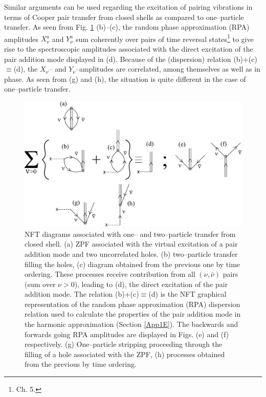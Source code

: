 Similar arguments can be used regarding the excitation of pairing vibrations in terms of Cooper pair transfer from closed shells as compared to one--particle transfer. As seen from Fig. \ref{fig2.1.5} (b)--(c), the random phase approximation (RPA) amplitudes $X_\nu^a$ and $Y^a_\nu$ sum coherently over pairs of time reversal states\footnote{\cite{Brink:05} Ch. 5.} to give rise to the spectroscopic amplitudes associated with the direct excitation of the pair addition mode displayed in (d). Because of the (dispersion) relation (b)+(c)$\equiv$(d), the $X_\nu$-- and $Y_\nu$--amplitudes are correlated, among themselves as well as in phase. As seen from (g) and (h), the situation is quite different in the case of one--particle transfer. 
\begin{figure}[h!]
\centerline {
\includegraphics*[width=15cm]{nutshell/figs/fig2_1_5}
}
\caption{NFT diagrams associated with one-- and two--particle transfer from closed shell. (a) ZPF associated with the virtual excitation of a pair addition mode and two uncorrelated holes. (b) two--particle transfer filling the holes, (c) diagram obtained from the previous one by time ordering. These processes receive contribution from all $(\nu,\bar\nu)$ pairs (sum over $\nu>0$), leading to (d), the direct excitation of the pair addition mode. The relation (b)+(c)$\equiv$(d) is the NFT graphical representation of the random phase approximation (RPA) dispersion relation used to calculate the properties of the pair addition mode in the harmonic approximation (Section \ref{App1E}). The backwards and forwards going RPA amplitudes are displayed in Figs. (e) and (f) respectively. (g) One--particle stripping proceeding through the filling of a hole associated with the ZPF, (h) processes obtained from the previous by time ordering.}
\label{fig2.1.5}
\end{figure}
